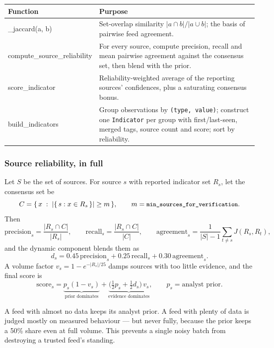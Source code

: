 \documentclass[11pt,a4paper]{article}
\newcommand{\code}[1]{\texttt{\small #1}}
\begin{document}
\begin{center}
\begin{tabularx}{\linewidth}{@{}>{\ttfamily\small}p{4.6cm}X@{}}
\toprule
\rowcolor{paper}\textbf{Function} & \textbf{Purpose} \\
\midrule
\_jaccard(a, b) & Set-overlap similarity $\lvert a\cap b\rvert/\lvert a\cup b\rvert$; the basis of pairwise feed agreement. \\
compute\_source\_reliability & For every source, compute precision, recall and mean pairwise agreement against the consensus set, then blend with the prior. \\
score\_indicator & Reliability-weighted average of the reporting sources' confidences, plus a saturating consensus bonus. \\
build\_indicators & Group observations by \code{(type, value)}; construct one \code{Indicator} per group with first/last-seen, merged tags, source count and score; sort by reliability. \\
\bottomrule
\end{tabularx}
\end{center}

\subsubsection{Source reliability, in full}
Let $S$ be the set of sources. For source $s$ with reported indicator set
$R_s$, let the consensus set be
\[
C = \{\, x \;:\; \lvert\{\,s : x \in R_s\,\}\rvert \ge m \,\},
\qquad m = \code{min\_sources\_for\_verification}.
\]
Then
\[
\mathrm{precision}_s = \frac{\lvert R_s \cap C\rvert}{\lvert R_s\rvert}, \qquad
\mathrm{recall}_s = \frac{\lvert R_s \cap C\rvert}{\lvert C\rvert}, \qquad
\mathrm{agreement}_s = \frac{1}{\lvert S\rvert-1}\sum_{t \neq s} J(R_s, R_t),
\]
and the dynamic component blends them as
\[
d_s = 0.45\,\mathrm{precision}_s + 0.25\,\mathrm{recall}_s + 0.30\,\mathrm{agreement}_s .
\]
A volume factor $v_s = 1 - e^{-\lvert R_s\rvert / 25}$ damps sources with too
little evidence, and the final score is
\[
\mathrm{score}_s = \underbrace{p_s(1-v_s)}_{\text{prior dominates}}
+ \underbrace{\big(\tfrac{1}{2}p_s + \tfrac{1}{2}d_s\big)\,v_s}_{\text{evidence dominates}},
\qquad p_s = \text{analyst prior}.
\]

\begin{keybox}
A feed with almost no data keeps its analyst prior. A feed with plenty of data is
judged mostly on measured behaviour --- but never fully, because the prior keeps
a 50\% share even at full volume. This prevents a single noisy batch from
destroying a trusted feed's standing.
\end{keybox}
\end{document}
